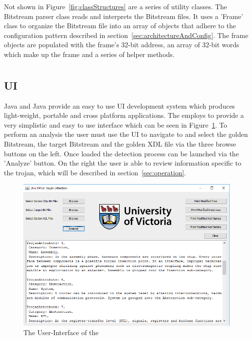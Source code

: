Not shown in Figure~\ref{fig:classStructures} are a series of utility classes.
The \gls{Bitstream} parser class reads and interprets the \gls{Bitstream} files. 
It uses a 'Frame' class to organize the \gls{Bitstream} file into an array of objects that adhere to the configuration pattern described in section~\ref{sec:architectureAndConfig}.
The frame objects are populated with the frame's 32-bit address, an array of 32-bit words which make up the frame and a series of helper methods.
\section{\Name}
\subsection{\acrfull{UI}}
Java and Java \Swing provide an easy to use \acrlong{UI} development system which produces light-weight, portable and cross platform applications.
The \NameNoPeriod employs \Swing to provide a very simplistic and easy to use interface which can be seen in Figure~\ref{fig:UI}.
To perform an analysis the user must use the \acrshort{UI} to navigate to and select the \gls{golden} \gls{Bitstream}, the \gls{target} \gls{Bitstream} and the \gls{golden} \acrshort{XDL} file via the three browse buttons on the left.
Once loaded the detection process can be launched via the 'Analyze' button.
On the right the user is able to review information specific to the trojan, which will be described in section~\ref{sec:operation}.
\begin{figure}
	\centering
	\includegraphics[width=0.96\linewidth]{Figures/UI}
	\caption[The User-Interface of the \NameNoPeriod]{The User-Interface of the \NameNoPeriod}
	\label{fig:UI}
\end{figure}

